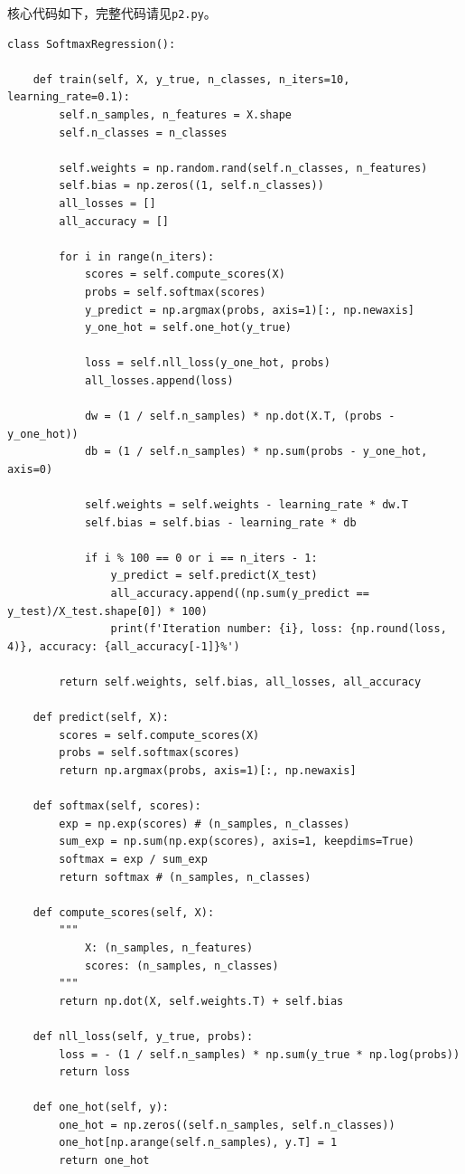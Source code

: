 \documentclass[logo,reportComp]{thesis}
\begin{document}
核心代码如下，完整代码请见\verb'p2.py'。
\begin{lstlisting}
class SoftmaxRegression():

	def train(self, X, y_true, n_classes, n_iters=10, learning_rate=0.1):
		self.n_samples, n_features = X.shape
		self.n_classes = n_classes
		
		self.weights = np.random.rand(self.n_classes, n_features)
		self.bias = np.zeros((1, self.n_classes))
		all_losses = []
		all_accuracy = []
		
		for i in range(n_iters):
			scores = self.compute_scores(X)
			probs = self.softmax(scores)
			y_predict = np.argmax(probs, axis=1)[:, np.newaxis]
			y_one_hot = self.one_hot(y_true)

			loss = self.nll_loss(y_one_hot, probs)
			all_losses.append(loss)

			dw = (1 / self.n_samples) * np.dot(X.T, (probs - y_one_hot))
			db = (1 / self.n_samples) * np.sum(probs - y_one_hot, axis=0)

			self.weights = self.weights - learning_rate * dw.T
			self.bias = self.bias - learning_rate * db

			if i % 100 == 0 or i == n_iters - 1:
				y_predict = self.predict(X_test)
				all_accuracy.append((np.sum(y_predict == y_test)/X_test.shape[0]) * 100)
				print(f'Iteration number: {i}, loss: {np.round(loss, 4)}, accuracy: {all_accuracy[-1]}%')

		return self.weights, self.bias, all_losses, all_accuracy

	def predict(self, X):
		scores = self.compute_scores(X)
		probs = self.softmax(scores)
		return np.argmax(probs, axis=1)[:, np.newaxis]

	def softmax(self, scores):
		exp = np.exp(scores) # (n_samples, n_classes)
		sum_exp = np.sum(np.exp(scores), axis=1, keepdims=True)
		softmax = exp / sum_exp
		return softmax # (n_samples, n_classes)

	def compute_scores(self, X):
		"""
		    X: (n_samples, n_features)
			scores: (n_samples, n_classes)
		"""
		return np.dot(X, self.weights.T) + self.bias

	def nll_loss(self, y_true, probs):
		loss = - (1 / self.n_samples) * np.sum(y_true * np.log(probs))
		return loss

	def one_hot(self, y):
		one_hot = np.zeros((self.n_samples, self.n_classes))
		one_hot[np.arange(self.n_samples), y.T] = 1
		return one_hot
\end{lstlisting}
\end{document}
